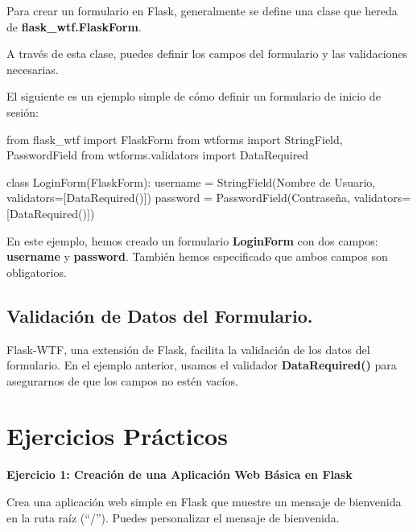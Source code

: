 \documentclass[
  a4paper,
  DIV=11,
  numbers=noendperiod,
  onepage,
  openany]{scrreprt}
\newenvironment{Shaded}{\begin{snugshade}}{\end{snugshade}}
\newcommand{\ImportTok}[1]{\textcolor[rgb]{0.00,0.46,0.62}{#1}}
\newcommand{\KeywordTok}[1]{\textcolor[rgb]{0.00,0.23,0.31}{#1}}
\newcommand{\NormalTok}[1]{\textcolor[rgb]{0.00,0.23,0.31}{#1}}
\newcommand{\OperatorTok}[1]{\textcolor[rgb]{0.37,0.37,0.37}{#1}}
\newcommand{\StringTok}[1]{\textcolor[rgb]{0.13,0.47,0.30}{#1}}
\begin{document}
Para crear un formulario en Flask, generalmente se define una clase que
hereda de \textbf{flask\_wtf.FlaskForm}.

A través de esta clase, puedes definir los campos del formulario y las
validaciones necesarias.

El siguiente es un ejemplo simple de cómo definir un formulario de
inicio de sesión:

\begin{Shaded}
\begin{Highlighting}[]
\ImportTok{from}\NormalTok{ flask\_wtf }\ImportTok{import}\NormalTok{ FlaskForm}
\ImportTok{from}\NormalTok{ wtforms }\ImportTok{import}\NormalTok{ StringField, PasswordField}
\ImportTok{from}\NormalTok{ wtforms.validators }\ImportTok{import}\NormalTok{ DataRequired}

\KeywordTok{class}\NormalTok{ LoginForm(FlaskForm):}
\NormalTok{    username }\OperatorTok{=}\NormalTok{ StringField(}\StringTok{\textquotesingle{}Nombre de Usuario\textquotesingle{}}\NormalTok{, validators}\OperatorTok{=}\NormalTok{[DataRequired()])}
\NormalTok{    password }\OperatorTok{=}\NormalTok{ PasswordField(}\StringTok{\textquotesingle{}Contraseña\textquotesingle{}}\NormalTok{, validators}\OperatorTok{=}\NormalTok{[DataRequired()])}
\end{Highlighting}
\end{Shaded}

En este ejemplo, hemos creado un formulario \textbf{LoginForm} con dos
campos: \textbf{username} y \textbf{password}. También hemos
especificado que ambos campos son obligatorios.

\subsection{Validación de Datos del
Formulario.}\label{validaciuxf3n-de-datos-del-formulario.}

Flask-WTF, una extensión de Flask, facilita la validación de los datos
del formulario. En el ejemplo anterior, usamos el validador
\textbf{DataRequired()} para asegurarnos de que los campos no estén
vacíos.

\section{Ejercicios Prácticos}\label{ejercicios-pruxe1cticos-2}

\textbf{Ejercicio 1: Creación de una Aplicación Web Básica en Flask}

Crea una aplicación web simple en Flask que muestre un mensaje de
bienvenida en la ruta raíz (``/''). Puedes personalizar el mensaje de
bienvenida.
\end{document}
